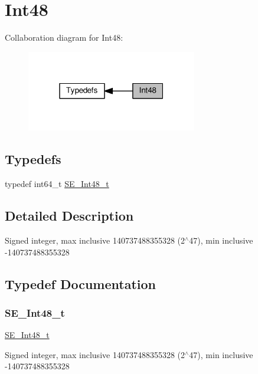 \hypertarget{group__Int48}{}\section{Int48}
\label{group__Int48}
Collaboration diagram for Int48\+:\nopagebreak
\begin{figure}[H]
\begin{center}
\leavevmode
\includegraphics[width=211pt]{group__Int48}
\end{center}
\end{figure}
\subsection*{Typedefs}
\begin{DoxyCompactItemize}
\item 
typedef int64\+\_\+t \hyperlink{group__Int48_ga87620025dc9f6c732fa48fcab95861ce}{S\+E\+\_\+\+Int48\+\_\+t}
\end{DoxyCompactItemize}


\subsection{Detailed Description}
Signed integer, max inclusive 140737488355328 (2$^\wedge$47), min inclusive -\/140737488355328 

\subsection{Typedef Documentation}
\mbox{\label{group__Int48_ga87620025dc9f6c732fa48fcab95861ce}} 
\subsubsection{\texorpdfstring{S\+E\+\_\+\+Int48\+\_\+t}{SE\_Int48\_t}}
{\footnotesize\ttfamily \hyperlink{group__Int48_ga87620025dc9f6c732fa48fcab95861ce}{S\+E\+\_\+\+Int48\+\_\+t}}

Signed integer, max inclusive 140737488355328 (2$^\wedge$47), min inclusive -\/140737488355328 
